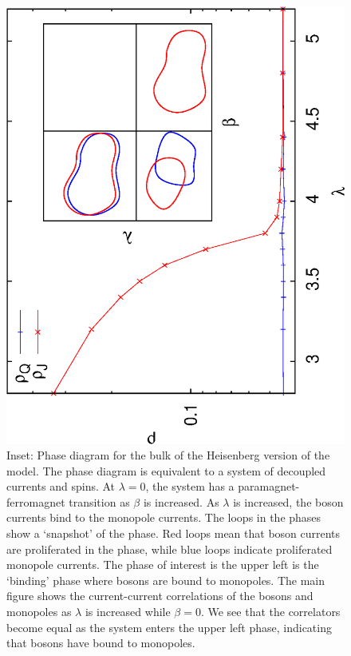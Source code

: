 \documentclass[prb,twocolumn]{revtex4}
\begin{document}
\begin{figure}
\includegraphics[angle=-90,width=0.9\linewidth]{figures/bulklines.eps}
\caption{Inset: Phase diagram for the bulk of the Heisenberg version of the model. The phase diagram is equivalent to a system of decoupled currents and spins. At $\lambda=0$, the system has a paramagnet-ferromagnet transition as $\beta$ is increased. As $\lambda$ is increased, the boson currents bind to the monopole currents. The loops in the phases show a `snapshot' of the phase. Red loops mean that boson currents are proliferated in the phase, while blue loops indicate proliferated monopole currents. The phase of interest is the upper left is the `binding' phase where bosons are bound to monopoles. The main figure shows the current-current correlations of the bosons and monopoles as $\lambda$ is increased while $\beta=0$. We see that the correlators become equal as the system enters the upper left phase, indicating that bosons have bound to monopoles.}
\label{bulkphase1}
\end{figure}
\end{document}

